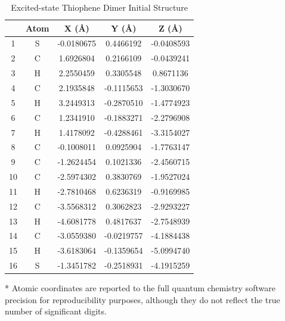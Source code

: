 \begin{table}[hbt!]\centering
\caption{Excited-state Thiophene Dimer Initial Structure}
\renewcommand{\arraystretch}{1.5}
\begin{threeparttable}
\begin{tabular}{ccccc}\toprule
{} & {Atom} & {X (\AA)} & {Y (\AA)} & {Z (\AA)} \\ \midrule
  1 & S & -0.0180675 & 0.4466192 & -0.0408593\\
  2 & C & 1.6926804 & 0.2166109 & -0.0439241\\
  3 & H & 2.2550459 & 0.3305548 & 0.8671136\\
  4 & C & 2.1935848 & -0.1115653 & -1.3030670\\
  5 & H & 3.2449313 & -0.2870510 & -1.4774923\\
  6 & C & 1.2341910 & -0.1883271 & -2.2796908\\
  7 & H & 1.4178092 & -0.4288461 & -3.3154027\\
  8 & C & -0.1008011 & 0.0925904 & -1.7763147\\
  9 & C & -1.2624454 & 0.1021336 & -2.4560715\\
  10 & C & -2.5974302 & 0.3830769 & -1.9527024\\
  11 & H & -2.7810468 & 0.6236319 & -0.9169985\\
  12 & C & -3.5568312 & 0.3062823 & -2.9293227\\
  13 & H & -4.6081778 & 0.4817637 & -2.7548939\\
  14 & C & -3.0559380 & -0.0219757 & -4.1884438\\
  15 & H & -3.6183064 & -0.1359654 & -5.0994740\\
  16 & S & -1.3451782 & -0.2518931 & -4.1915259\\ \bottomrule
\end{tabular}
\begin{tablenotes}
\item[*] \footnotesize Atomic coordinates are reported to the full quantum chemistry software precision for reproducibility purposes, although they do not reflect the true number of significant digits.
\end{tablenotes}
\end{threeparttable}
\end{table}

